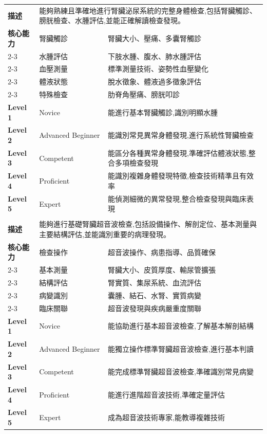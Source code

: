 \documentclass[12pt,a4paper]{article}
\begin{document}
\begin{longtable}{|p{1.2cm}|p{3.8cm}|p{8.5cm}|}
\rowcolor{nephro_blue!10}
\multicolumn{3}{|c|}{\textbf{EPA 2: 腎臟泌尿系統身體檢查}} \\
\hline
\textbf{描述} & \multicolumn{2}{|p{12.5cm}|}{能夠熟練且準確地進行腎臟泌尿系統的完整身體檢查,包括腎臟觸診、膀胱檢查、水腫評估,並能正確解讀檢查發現。} \\
\hline
\textbf{核心能力} & 腎臟觸診 & 腎臟大小、壓痛、多囊腎觸診 \\
\cline{2-3}
& 水腫評估 & 下肢水腫、腹水、肺水腫評估 \\
\cline{2-3}
& 血壓測量 & 標準測量技術、姿勢性血壓變化 \\
\cline{2-3}
& 體液狀態 & 脫水徵象、體液過多徵象評估 \\
\cline{2-3}
& 特殊檢查 & 肋脊角壓痛、膀胱叩診 \\
\hline
\textbf{Level 1} & Novice & 能進行基本腎臟觸診,識別明顯水腫 \\
\hline
\textbf{Level 2} & Advanced Beginner & 能識別常見異常身體發現,進行系統性腎臟檢查 \\
\hline
\textbf{Level 3} & Competent & 能區分各種異常身體發現,準確評估體液狀態,整合多項檢查發現 \\
\hline
\textbf{Level 4} & Proficient & 能識別複雜身體發現特徵,檢查技術精準且有效率 \\
\hline
\textbf{Level 5} & Expert & 能偵測細微的異常發現,整合檢查發現與臨床表現 \\
\hline

\rowcolor{nephro_blue!10}
\multicolumn{3}{|c|}{\textbf{EPA 3: 腎臟超音波基礎操作與判讀}} \\
\hline
\textbf{描述} & \multicolumn{2}{|p{12.5cm}|}{能夠進行基礎腎臟超音波檢查,包括設備操作、解剖定位、基本測量與主要結構評估,並能識別重要的病理發現。} \\
\hline
\textbf{核心能力} & 檢查操作 & 超音波操作、病患指導、品質確保 \\
\cline{2-3}
& 基本測量 & 腎臟大小、皮質厚度、輸尿管擴張 \\
\cline{2-3}
& 結構評估 & 腎實質、集尿系統、血流評估 \\
\cline{2-3}
& 病變識別 & 囊腫、結石、水腎、實質病變 \\
\cline{2-3}
& 臨床關聯 & 超音波發現與疾病嚴重度關聯 \\
\hline
\textbf{Level 1} & Novice & 能協助進行基本超音波檢查,了解基本解剖結構 \\
\hline
\textbf{Level 2} & Advanced Beginner & 能獨立操作標準腎臟超音波檢查,進行基本判讀 \\
\hline
\textbf{Level 3} & Competent & 能完成標準腎臟超音波檢查,準確識別常見病變 \\
\hline
\textbf{Level 4} & Proficient & 能進行進階超音波技術,準確定量評估 \\
\hline
\textbf{Level 5} & Expert & 成為超音波技術專家,能教導複雜技術 \\
\hline


\end{longtable}
\end{document}
